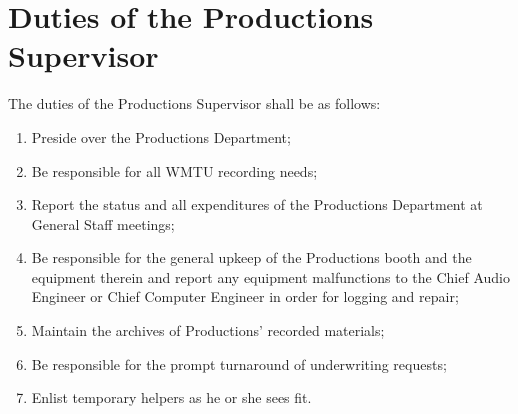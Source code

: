 \documentclass[12pt]{constitution}
\begin{document}
\section{​Duties of the Productions Supervisor}
The duties of the Productions Supervisor shall be as follows:
\begin{enumerate}
\item Preside over the Productions Department;
\item Be responsible for all WMTU recording needs;
\item Report the status and all expenditures of the Productions Department at General Staff meetings;
\item Be responsible for the general upkeep of the Productions booth and the equipment therein and report any equipment malfunctions to the Chief Audio Engineer or Chief Computer Engineer in order for logging and repair;
\item Maintain the archives of Productions' recorded materials;
\item Be responsible for the prompt turnaround of underwriting requests;
\item Enlist temporary helpers as he or she sees fit.
\end{enumerate}
\end{document}
